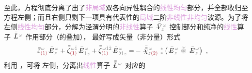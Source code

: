 至此，方程彻底分离了出了\textcolor{Plum}{非局域}\textcolor{PineGreen}{双各向异性}耦合的\textcolor{Plum}{线性}\textcolor{Plum}{均匀}部分，并全部收归至方程左侧；而且右侧只剩下一项具有代表性的\textcolor{Plum}{局域}二阶\textcolor{Plum}{非线性}\textcolor{Plum}{非均匀}\textcolor{NavyBlue}{波源}。为了将左侧\textcolor{Plum}{线性}\textcolor{Plum}{均匀}部分，分解为泾渭分明的\textcolor{Plum}{非线性}算子 $\xint{\mathcolor{gray}{-}}{21}{\bar{\bar{V}}}^{\;\! \mathcolor{gray}{\omega}}_{\;\! \mathcolor{gray}{z}}$ 控制部分和纯净的\textcolor{Plum}{线性}算子 $\xint{\mathcolor{gray}{-}}{30}{\bar{\bar{L}}}^{\;\! \mathcolor{gray}{\omega}}$ 作用部分（的叠加）， 最好写成矢量（非分量）形式
\begin{align} \label{eq:nonlinear(2)-wave_wkrho-simplify5-vector}
	\bar{\bar{\varepsilon}}^{\;\! \mathcolor{gray}{\omega}}_{\textcolor{Maroon}{(1)}} \xint{\mathcolor{gray}{-}}{295}{\bar{E}}^{\;\!\mathcolor{gray}{\omega}}_{\;\! \mathcolor{gray}{z}} + \bar{\bar{\zeta}}^{\;\! \mathcolor{gray}{\omega} \mathcolor{gray}{\check{1}}}_{\textcolor{Maroon}{(1)}} \xint{\mathcolor{gray}{-}}{295}{\bar{E}}^{\;\!\mathcolor{gray}{\omega}}_{\;\! \mathcolor{gray}{\check{1}} \mathcolor{gray}{z}} + \bar{\bar{\zeta}}^{\;\! \mathcolor{gray}{\omega} \mathcolor{gray}{\check{1} \check{2}}}_{\textcolor{Maroon}{(1)}} \xint{\mathcolor{gray}{-}}{295}{\bar{E}}^{\;\!\mathcolor{gray}{\omega}}_{\;\! \mathcolor{gray}{\check{2} \check{1}} \mathcolor{gray}{z}}
	= &- \xint{{}^{}_{\mathcolor{gray}{-}}}{23}{\bar{\bar{\bar{\chi}}}}^{\;\! \mathcolor{gray}{\omega}}_{\mathcolor{gray}{z} \textcolor{Maroon}{(2)}} ~{}^{\mathcolor{gray}{*}}_{\mathcolor{gray}{*}} \left( \xint{\mathcolor{gray}{-}}{295}{\bar{E}}^{\;\!\mathcolor{gray}{\omega}}_{\;\! \mathcolor{gray}{z}} ~\mathcolor{gray}{\widetilde \circledast}~ \xint{\mathcolor{gray}{-}}{295}{\bar{E}}^{\;\!\mathcolor{gray}{\omega}}_{\;\! \mathcolor{gray}{z}} \right) ~,
\end{align}
利用 ，可将  左侧，分离出\textcolor{Plum}{线性}算子 $\xint{\mathcolor{gray}{-}}{30}{\bar{\bar{L}}}^{\;\! \mathcolor{gray}{\omega}}$ 对应的

